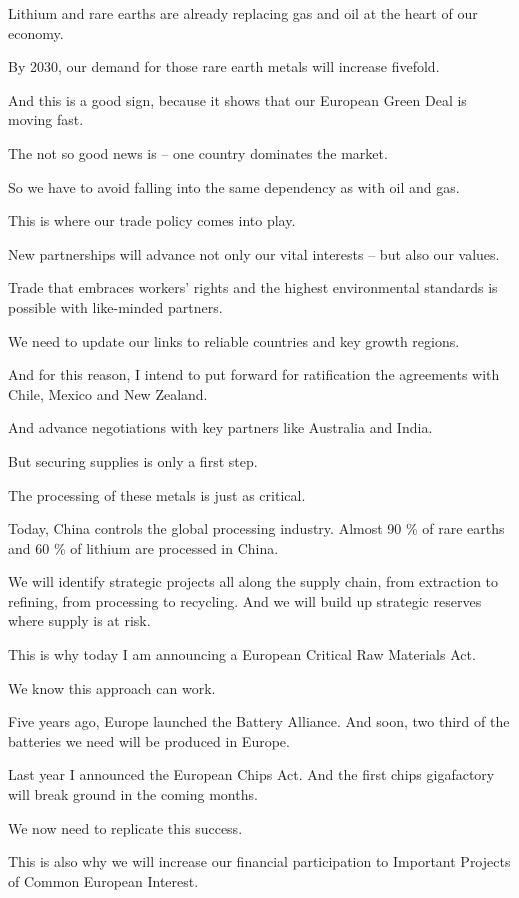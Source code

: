\documentclass[a4paper,11pt]{article}
\begin{document}
Lithium and rare earths are already replacing gas and oil at the heart of our economy.

By 2030, our demand for those rare earth metals will increase fivefold.

And this is a good sign, because it shows that our European Green Deal is moving fast.

The not so good news is – one country dominates the market.

So we have to avoid falling into the same dependency as with oil and gas.

This is where our trade policy comes into play.

New partnerships will advance not only our vital interests – but also our values.

Trade that embraces workers' rights and the highest environmental standards is possible with like-minded partners.

We need to update our links to reliable countries and key growth regions.

And for this reason, I intend to put forward for ratification the agreements with Chile, Mexico and New Zealand.

And advance negotiations with key partners like Australia and India.

 

But securing supplies is only a first step.

The processing of these metals is just as critical.

Today, China controls the global processing industry. Almost 90 \% of rare earths and 60 \% of lithium are processed in China.

We will identify strategic projects all along the supply chain, from extraction to refining, from processing to recycling. And we will build up strategic reserves where supply is at risk.

This is why today I am announcing a European Critical Raw Materials Act.

We know this approach can work.

Five years ago, Europe launched the Battery Alliance. And soon, two third of the batteries we need will be produced in Europe.

Last year I announced the European Chips Act. And the first chips gigafactory will break ground in the coming months.

We now need to replicate this success.

This is also why we will increase our financial participation to Important Projects of Common European Interest.
\end{document}
